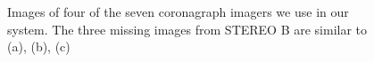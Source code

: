 \documentclass[journal]{vgtc}                %
\begin{document}
\begin{figure}
{}
\caption{Images of four of the seven coronagraph imagers we use in our system. The three missing images from STEREO B are similar to (a), (b), (c)}
\label{fig:coronagraph}
\end{figure}
\end{document}
